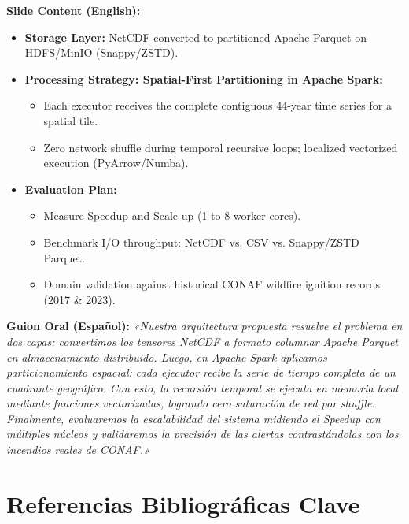 \documentclass[11pt,a4paper]{article}
\begin{document}
\begin{tcolorbox}[colback=white, colframe=primaryblue, title=\textbf{Slide 5: Proposed Processing Architecture \& Evaluation (3:45 -- 5:00)}]
\textbf{Slide Content (English):}
\begin{itemize}[leftmargin=4mm, itemsep=1pt]
    \item \textbf{Storage Layer:} NetCDF converted to partitioned Apache Parquet on HDFS/MinIO (Snappy/ZSTD).
    \item \textbf{Processing Strategy: Spatial-First Partitioning in Apache Spark:}
    \begin{itemize}[leftmargin=4mm]
        \item Each executor receives the complete contiguous 44-year time series for a spatial tile.
        \item Zero network shuffle during temporal recursive loops; localized vectorized execution (PyArrow/Numba).
    \end{itemize}
    \item \textbf{Evaluation Plan:}
    \begin{itemize}[leftmargin=4mm]
        \item Measure Speedup and Scale-up (1 to 8 worker cores).
        \item Benchmark I/O throughput: NetCDF vs. CSV vs. Snappy/ZSTD Parquet.
        \item Domain validation against historical CONAF wildfire ignition records (2017 \& 2023).
    \end{itemize}
\end{itemize}
\textbf{Guion Oral (Español):}
\textit{«Nuestra arquitectura propuesta resuelve el problema en dos capas: convertimos los tensores NetCDF a formato columnar Apache Parquet en almacenamiento distribuido. Luego, en Apache Spark aplicamos particionamiento espacial: cada ejecutor recibe la serie de tiempo completa de un cuadrante geográfico. Con esto, la recursión temporal se ejecuta en memoria local mediante funciones vectorizadas, logrando cero saturación de red por shuffle. Finalmente, evaluaremos la escalabilidad del sistema midiendo el Speedup con múltiples núcleos y validaremos la precisión de las alertas contrastándolas con los incendios reales de CONAF.»}
\end{tcolorbox}

\section{Referencias Bibliográficas Clave}
\end{document}
